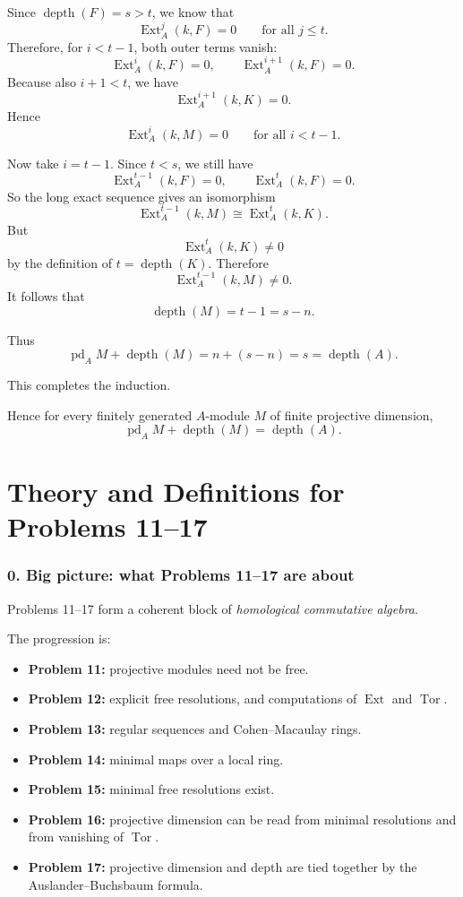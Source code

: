 \documentclass[12pt,a4paper]{article}
\theoremstyle{notespace}
\begin{document}
Since \(\operatorname{depth}(F)=s>t\), we know that
\[
\operatorname{Ext}_A^j(k,F)=0
\qquad\text{for all }j\le t.
\]
Therefore, for \(i<t-1\), both outer terms vanish:
\[
\operatorname{Ext}_A^i(k,F)=0,
\qquad
\operatorname{Ext}_A^{i+1}(k,F)=0.
\]
Because also \(i+1<t\), we have
\[
\operatorname{Ext}_A^{i+1}(k,K)=0.
\]
Hence
\[
\operatorname{Ext}_A^i(k,M)=0
\qquad\text{for all }i<t-1.
\]

Now take \(i=t-1\). Since \(t<s\), we still have
\[
\operatorname{Ext}_A^{t-1}(k,F)=0,
\qquad
\operatorname{Ext}_A^{t}(k,F)=0.
\]
So the long exact sequence gives an isomorphism
\[
\operatorname{Ext}_A^{t-1}(k,M)\cong \operatorname{Ext}_A^t(k,K).
\]
But
\[
\operatorname{Ext}_A^t(k,K)\neq 0
\]
by the definition of \(t=\operatorname{depth}(K)\). Therefore
\[
\operatorname{Ext}_A^{t-1}(k,M)\neq 0.
\]
It follows that
\[
\operatorname{depth}(M)=t-1=s-n.
\]

Thus
\[
\operatorname{pd}_A M+\operatorname{depth}(M)
=
n+(s-n)=s=\operatorname{depth}(A).
\]

This completes the induction.

\medskip

Hence for every finitely generated \(A\)-module \(M\) of finite projective dimension,
\[
\boxed{
	\operatorname{pd}_A M+\operatorname{depth}(M)=\operatorname{depth}(A).
}
\]

\part{Theory and Definitions for Problems 11--17}

\section{0. Big picture: what Problems 11--17 are about}

Problems 11--17 form a coherent block of \emph{homological commutative algebra}.

The progression is:

\begin{itemize}
	\item \textbf{Problem 11:} projective modules need not be free.
	\item \textbf{Problem 12:} explicit free resolutions, and computations of \(\operatorname{Ext}\) and \(\operatorname{Tor}\).
	\item \textbf{Problem 13:} regular sequences and Cohen--Macaulay rings.
	\item \textbf{Problem 14:} minimal maps over a local ring.
	\item \textbf{Problem 15:} minimal free resolutions exist.
	\item \textbf{Problem 16:} projective dimension can be read from minimal resolutions and from vanishing of \(\operatorname{Tor}\).
	\item \textbf{Problem 17:} projective dimension and depth are tied together by the Auslander--Buchsbaum formula.
\end{itemize}
\end{document}

